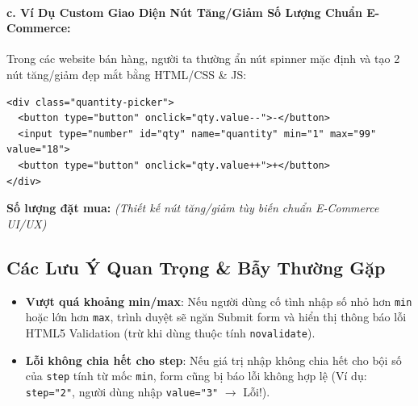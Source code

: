 \documentclass[11pt,oneside]{book}
\newcommand{\codeinline}[1]{\textcolor{accentOrange}{\texttt{#1}}}
\begin{document}
\paragraph{c. Ví Dụ Custom Giao Diện Nút Tăng/Giảm Số Lượng Chuẩn E-Commerce:}
Trong các website bán hàng, người ta thường ẩn nút spinner mặc định và tạo 2 nút tăng/giảm đẹp mắt bằng HTML/CSS \& JS:

\begin{codeWindow}
\begin{lstlisting}[language=HTML5]
<div class="quantity-picker">
  <button type="button" onclick="qty.value--">-</button>
  <input type="number" id="qty" name="quantity" min="1" max="99" value="18">
  <button type="button" onclick="qty.value++">+</button>
</div>
\end{lstlisting}
\end{codeWindow}

\begin{browserWindow}
\sffamily\small
\textbf{Số lượng đặt mua:} \quad
{} \qquad \textcolor{codeComment}{\small\textit{(Thiết kế nút tăng/giảm tùy biến chuẩn E-Commerce UI/UX)}}
\end{browserWindow}

\subsection{Các Lưu Ý Quan Trọng \& Bẫy Thường Gặp}

\begin{warnBox}
\begin{itemize}[leftmargin=1.5em, itemsep=2pt, parsep=0pt]
    \item \textbf{Vượt quá khoảng min/max}: Nếu người dùng cố tình nhập số nhỏ hơn \codeinline{min} hoặc lớn hơn \codeinline{max}, trình duyệt sẽ ngăn Submit form và hiển thị thông báo lỗi HTML5 Validation (trừ khi dùng thuộc tính \codeinline{novalidate}).
    \item \textbf{Lỗi không chia hết cho step}: Nếu giá trị nhập không chia hết cho bội số của \codeinline{step} tính từ mốc \codeinline{min}, form cũng bị báo lỗi không hợp lệ (Ví dụ: \codeinline{step="2"}, người dùng nhập \codeinline{value="3"} $\rightarrow$ Lỗi!).
\end{itemize}
\end{warnBox}
\end{document}
